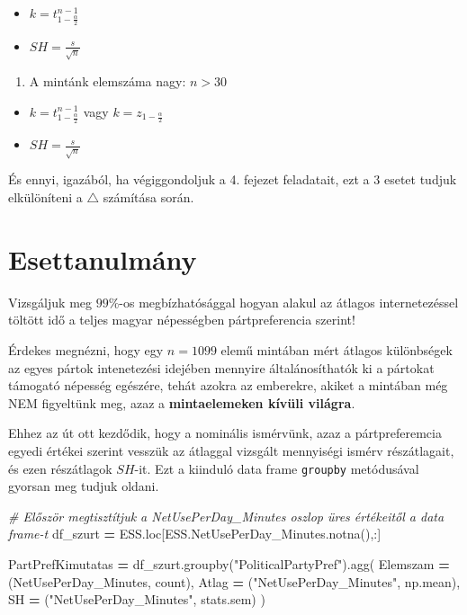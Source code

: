 \documentclass[
]{book}
\newenvironment{Shaded}{\begin{snugshade}}{\end{snugshade}}
\newcommand{\CommentTok}[1]{\textcolor[rgb]{0.56,0.35,0.01}{\textit{#1}}}
\newcommand{\NormalTok}[1]{#1}
\newcommand{\OperatorTok}[1]{\textcolor[rgb]{0.81,0.36,0.00}{\textbf{#1}}}
\newcommand{\StringTok}[1]{\textcolor[rgb]{0.31,0.60,0.02}{#1}}
\providecommand{\tightlist}{%
  \setlength{\itemsep}{0pt}\setlength{\parskip}{0pt}}
\begin{document}
\begin{itemize}
\tightlist
\item
  \(k=t_{1-\frac{\alpha}{2}}^{n-1}\)
\item
  \(SH=\frac{s}{\sqrt{n}}\)
\end{itemize}

\begin{enumerate}
\def\labelenumi{\arabic{enumi}.}
\setcounter{enumi}{2}
\tightlist
\item
  A mintánk elemszáma nagy: \(n > 30\)
\end{enumerate}

\begin{itemize}
\tightlist
\item
  \(k=t_{1-\frac{\alpha}{2}}^{n-1}\) vagy \(k=z_{1-\frac{\alpha}{2}}\)
\item
  \(SH=\frac{s}{\sqrt{n}}\)
\end{itemize}

És ennyi, igazából, ha végiggondoljuk a 4. fejezet feladatait, ezt a \(3\) esetet tudjuk elkülöníteni a \(\triangle\) számítása során.

\section{Esettanulmány}\label{esettanulmuxe1ny}

Vizsgáljuk meg \(99\%\)-os megbízhatósággal hogyan alakul az átlagos internetezéssel töltött idő a teljes magyar népességben pártpreferencia szerint!

Érdekes megnézni, hogy egy \(n=1099\) elemű mintában mért átlagos különbségek az egyes pártok intenetezési idejében mennyire általánosíthatók ki a pártokat támogató népesség egészére, tehát azokra az emberekre, akiket a mintában még NEM figyeltünk meg, azaz a \textbf{mintaelemeken kívüli világra}.

Ehhez az út ott kezdődik, hogy a nominális ismérvünk, azaz a pártpreferemcia egyedi értékei szerint vesszük az átlaggal vizsgált mennyiségi ismérv részátlagait, és ezen részátlagok \(SH\)-it. Ezt a kiinduló data frame \texttt{groupby} metódusával gyorsan meg tudjuk oldani.

\begin{Shaded}
\begin{Highlighting}[]
\CommentTok{\# Először megtisztítjuk a \textquotesingle{}NetUsePerDay\_Minutes\textquotesingle{} oszlop üres értékeitől a data frame{-}t}
\NormalTok{df\_szurt }\OperatorTok{=}\NormalTok{ ESS.loc[ESS.NetUsePerDay\_Minutes.notna(),:]}

\NormalTok{PartPrefKimutatas }\OperatorTok{=}\NormalTok{ df\_szurt.groupby(}\StringTok{"PoliticalPartyPref"}\NormalTok{).agg(}
\NormalTok{  Elemszam }\OperatorTok{=}\NormalTok{ (}\StringTok{\textquotesingle{}NetUsePerDay\_Minutes\textquotesingle{}}\NormalTok{, }\StringTok{\textquotesingle{}count\textquotesingle{}}\NormalTok{),}
\NormalTok{  Atlag }\OperatorTok{=}\NormalTok{ (}\StringTok{"NetUsePerDay\_Minutes"}\NormalTok{, np.mean),}
\NormalTok{  SH }\OperatorTok{=}\NormalTok{ (}\StringTok{"NetUsePerDay\_Minutes"}\NormalTok{, stats.sem)}
\NormalTok{)}
\end{Highlighting}
\end{Shaded}
\end{document}
